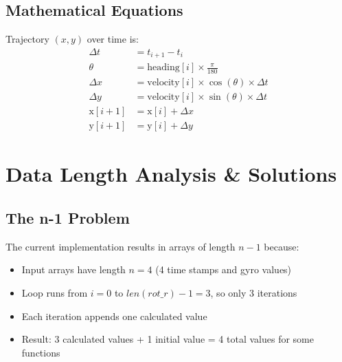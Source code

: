 \documentclass{article}
\begin{document}
\subsection{Mathematical Equations}
Trajectory $(x, y)$ over time is:
\begin{align*}
\Delta t &= t_{i+1} - t_i \\
\theta &= \text{heading}[i] \times \frac{\pi}{180} \\
\Delta x &= \text{velocity}[i] \times \cos(\theta) \times \Delta t \\
\Delta y &= \text{velocity}[i] \times \sin(\theta) \times \Delta t \\
\text{x}[i+1] &= \text{x}[i] + \Delta x \\
\text{y}[i+1] &= \text{y}[i] + \Delta y
\end{align*}

\section{Data Length Analysis \& Solutions}

\subsection{The n-1 Problem}
The current implementation results in arrays of length $n-1$ because:
\begin{itemize}
\item Input arrays have length $n = 4$ (4 time stamps and gyro values)
\item Loop runs from $i = 0$ to $len(rot\_r) - 1 = 3$, so only 3 iterations
\item Each iteration appends one calculated value
\item Result: 3 calculated values + 1 initial value = 4 total values for some functions
\end{itemize}
\end{document}
